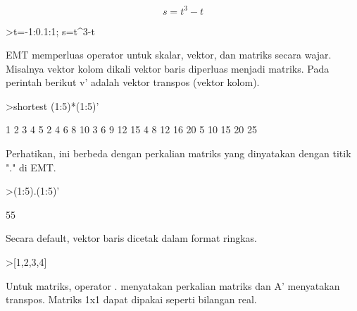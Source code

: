 \documentclass[a4paper,10pt]{article}
\begin{document}
\begin{eulernotebook}
\begin{eulercomment}
\begin{eulercomment}
\begin{eulercomment}
\begin{eulercomment}
\begin{eulercomment}
\begin{eulercomment}
\begin{eulercomment}
\begin{eulercomment}
\begin{eulercomment}
\begin{eulercomment}
\begin{eulercomment}
\begin{eulercomment}
\begin{eulercomment}
\begin{eulercomment}
\begin{eulercomment}
\begin{eulercomment}
\begin{eulercomment}
\end{eulercomment}
\begin{eulerformula}
\[
s = t^3-t
\]
\end{eulerformula}
\begin{eulerprompt}
>t=-1:0.1:1; s=t^3-t
\end{eulerprompt}
\begin{euleroutput}
  [0,  0.171,  0.288,  0.357,  0.384,  0.375,  0.336,  0.273,  0.192,
  0.099,  0,  -0.099,  -0.192,  -0.273,  -0.336,  -0.375,  -0.384,
  -0.357,  -0.288,  -0.171,  0]
\end{euleroutput}
\begin{eulercomment}
EMT memperluas operator untuk skalar, vektor, dan matriks secara wajar.
Misalnya vektor kolom dikali vektor baris diperluas menjadi matriks. Pada
perintah berikut v' adalah vektor transpos (vektor kolom).
\end{eulercomment}
\begin{eulerprompt}
>shortest (1:5)*(1:5)'
\end{eulerprompt}
\begin{euleroutput}
       1      2      3      4      5 
       2      4      6      8     10 
       3      6      9     12     15 
       4      8     12     16     20 
       5     10     15     20     25 
\end{euleroutput}
\begin{eulercomment}
Perhatikan, ini berbeda dengan perkalian matriks yang dinyatakan dengan
titik "." di EMT.
\end{eulercomment}
\begin{eulerprompt}
>(1:5).(1:5)'
\end{eulerprompt}
\begin{euleroutput}
  55
\end{euleroutput}
\begin{eulercomment}
Secara default, vektor baris dicetak dalam format ringkas.
\end{eulercomment}
\begin{eulerprompt}
>[1,2,3,4]
\end{eulerprompt}
\begin{euleroutput}
  [1,  2,  3,  4]
\end{euleroutput}
\begin{eulercomment}
Untuk matriks, operator . menyatakan perkalian matriks dan A' menyatakan
transpos. Matriks 1x1 dapat dipakai seperti bilangan real.
\end{eulercomment}
\begin{eulerprompt}

\end{eulerprompt}
\end{eulercomment}
\end{eulercomment}
\end{eulercomment}
\end{eulercomment}
\end{eulercomment}
\end{eulercomment}
\end{eulercomment}
\end{eulercomment}
\end{eulercomment}
\end{eulercomment}
\end{eulercomment}
\end{eulercomment}
\end{eulercomment}
\end{eulercomment}
\end{eulercomment}
\end{eulercomment}
\end{eulernotebook}
\end{document}
